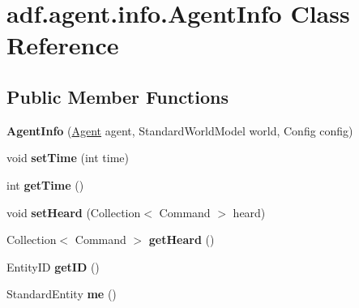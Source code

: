 \hypertarget{classadf_1_1agent_1_1info_1_1AgentInfo}{}\section{adf.\+agent.\+info.\+Agent\+Info Class Reference}
\label{classadf_1_1agent_1_1info_1_1AgentInfo}
\subsection*{Public Member Functions}
\begin{DoxyCompactItemize}
\item 
\hypertarget{classadf_1_1agent_1_1info_1_1AgentInfo_ac47ac11456ed03e8b98e1bfdb064dd18}{}\label{classadf_1_1agent_1_1info_1_1AgentInfo_ac47ac11456ed03e8b98e1bfdb064dd18} 
{\bfseries Agent\+Info} (\hyperlink{classadf_1_1agent_1_1Agent}{Agent} agent, Standard\+World\+Model world, Config config)
\item 
\hypertarget{classadf_1_1agent_1_1info_1_1AgentInfo_ad71982be9431abce3530ef4622852b34}{}\label{classadf_1_1agent_1_1info_1_1AgentInfo_ad71982be9431abce3530ef4622852b34} 
void {\bfseries set\+Time} (int time)
\item 
\hypertarget{classadf_1_1agent_1_1info_1_1AgentInfo_a2d1b58a841fd0092b5810b98a61bb9bb}{}\label{classadf_1_1agent_1_1info_1_1AgentInfo_a2d1b58a841fd0092b5810b98a61bb9bb} 
int {\bfseries get\+Time} ()
\item 
\hypertarget{classadf_1_1agent_1_1info_1_1AgentInfo_a23b8ecd1a583015ab5b6734ef513368f}{}\label{classadf_1_1agent_1_1info_1_1AgentInfo_a23b8ecd1a583015ab5b6734ef513368f} 
void {\bfseries set\+Heard} (Collection$<$ Command $>$ heard)
\item 
\hypertarget{classadf_1_1agent_1_1info_1_1AgentInfo_aa1a2550f424cc19a8b4d01531f2c797a}{}\label{classadf_1_1agent_1_1info_1_1AgentInfo_aa1a2550f424cc19a8b4d01531f2c797a} 
Collection$<$ Command $>$ {\bfseries get\+Heard} ()
\item 
\hypertarget{classadf_1_1agent_1_1info_1_1AgentInfo_a378db4a943ea7e16821b4950a59dfacf}{}\label{classadf_1_1agent_1_1info_1_1AgentInfo_a378db4a943ea7e16821b4950a59dfacf} 
Entity\+ID {\bfseries get\+ID} ()
\item 
\hypertarget{classadf_1_1agent_1_1info_1_1AgentInfo_a091c4fe745d95da7b3415c8f20626230}{}\label{classadf_1_1agent_1_1info_1_1AgentInfo_a091c4fe745d95da7b3415c8f20626230} 
Standard\+Entity {\bfseries me} ()
\item 
\hypertarget{classadf_1_1agent_1_1info_1_1AgentInfo_a4ed5eba8b822332d06d151dadd5ba953}{}\label{classadf_1_1agent_1_1info_1_1AgentInfo_a4ed5eba8b822332d06d151dadd5ba953} 

\end{DoxyCompactItemize}
